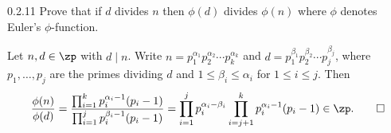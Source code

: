 \begin{exercise}{0.2.11}
    Prove that if $d$ divides $n$ then $\phi(d)$ divides $\phi(n)$ where $\phi$ denotes Euler's $\phi$-function.
\end{exercise}

\begin{sol}
    Let $n, d \in \zp$ with $d \mid n$.
    Write $n = p_1^{\alpha_1} p_2^{\alpha_2} \cdots p_k^{\alpha_k}$ and $d = p_1^{\beta_1} p_2^{\beta_2} \cdots p_j^{\beta_j}$, where $p_1, \ldots, p_j$ are the primes dividing $d$ and $1 \leq \beta_i \leq \alpha_i$ for $1 \leq i \leq j$.
    Then
    \[
        \frac{\phi(n)}{\phi(d)} = \frac{\prod_{i=1}^k p_i^{\alpha_i - 1}(p_i - 1)}{\prod_{i=1}^j p_i^{\beta_i - 1}(p_i - 1)} = \prod_{i=1}^j p_i^{\alpha_i - \beta_i} \prod_{i=j+1}^k p_i^{\alpha_i - 1}(p_i - 1) \in \zp. \qedhere
    \]
\end{sol}